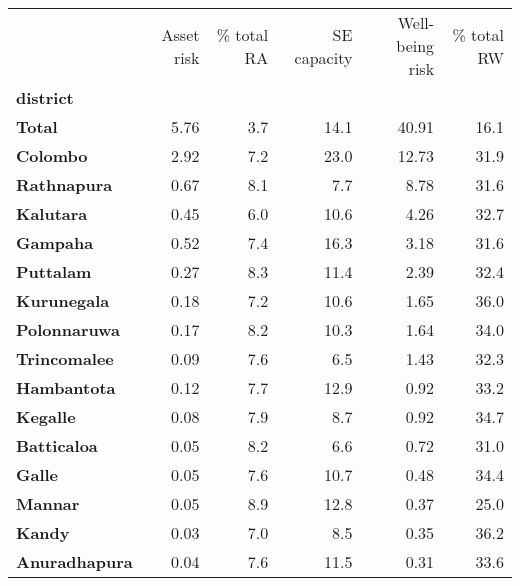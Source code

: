 \begin{tabular}{lrrrrr}
\toprule
{} &  Asset risk &  \% total RA &  SE capacity &  Well-being risk &  \% total RW \\
\textbf{district    } &             &             &              &                  &             \\
\midrule
\textbf{Total       } &        5.76 &         3.7 &         14.1 &            40.91 &        16.1 \\
\textbf{Colombo     } &        2.92 &         7.2 &         23.0 &            12.73 &        31.9 \\
\textbf{Rathnapura  } &        0.67 &         8.1 &          7.7 &             8.78 &        31.6 \\
\textbf{Kalutara    } &        0.45 &         6.0 &         10.6 &             4.26 &        32.7 \\
\textbf{Gampaha     } &        0.52 &         7.4 &         16.3 &             3.18 &        31.6 \\
\textbf{Puttalam    } &        0.27 &         8.3 &         11.4 &             2.39 &        32.4 \\
\textbf{Kurunegala  } &        0.18 &         7.2 &         10.6 &             1.65 &        36.0 \\
\textbf{Polonnaruwa } &        0.17 &         8.2 &         10.3 &             1.64 &        34.0 \\
\textbf{Trincomalee } &        0.09 &         7.6 &          6.5 &             1.43 &        32.3 \\
\textbf{Hambantota  } &        0.12 &         7.7 &         12.9 &             0.92 &        33.2 \\
\textbf{Kegalle     } &        0.08 &         7.9 &          8.7 &             0.92 &        34.7 \\
\textbf{Batticaloa  } &        0.05 &         8.2 &          6.6 &             0.72 &        31.0 \\
\textbf{Galle       } &        0.05 &         7.6 &         10.7 &             0.48 &        34.4 \\
\textbf{Mannar      } &        0.05 &         8.9 &         12.8 &             0.37 &        25.0 \\
\textbf{Kandy       } &        0.03 &         7.0 &          8.5 &             0.35 &        36.2 \\
\textbf{Anuradhapura} &        0.04 &         7.6 &         11.5 &             0.31 &        33.6 \\

\end{tabular}
